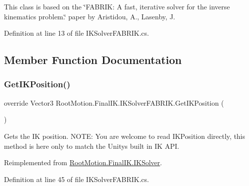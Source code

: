 This class is based on the \char`\"{}\+F\+A\+B\+R\+I\+K\+: A fast, iterative solver for the inverse kinematics problem.\char`\"{} paper by Aristidou, A., Lasenby, J. 

Definition at line 13 of file I\+K\+Solver\+F\+A\+B\+R\+I\+K.\+cs.



\subsection{Member Function Documentation}
\mbox{\label{class_root_motion_1_1_final_i_k_1_1_i_k_solver_f_a_b_r_i_k_a7f4bae5e4ea308ac0b86a1694e60341a}} 
\subsubsection{\texorpdfstring{Get\+I\+K\+Position()}{GetIKPosition()}}
{\footnotesize\ttfamily override Vector3 Root\+Motion.\+Final\+I\+K.\+I\+K\+Solver\+F\+A\+B\+R\+I\+K.\+Get\+I\+K\+Position (\begin{DoxyParamCaption}{ }\end{DoxyParamCaption})\hspace{0.3cm}{\ttfamily [virtual]}}



Gets the IK position. N\+O\+TE\+: You are welcome to read I\+K\+Position directly, this method is here only to match the Unity\textquotesingle{}s built in IK A\+PI. 



Reimplemented from \mbox{\hyperlink{class_root_motion_1_1_final_i_k_1_1_i_k_solver_aed08007156944c206abc59fa8da029ab}{Root\+Motion.\+Final\+I\+K.\+I\+K\+Solver}}.



Definition at line 45 of file I\+K\+Solver\+F\+A\+B\+R\+I\+K.\+cs.

\mbox{\label{class_root_motion_1_1_final_i_k_1_1_i_k_solver_f_a_b_r_i_k_a1d4c5d7ee7db732fca38ca620fecd072}} 
